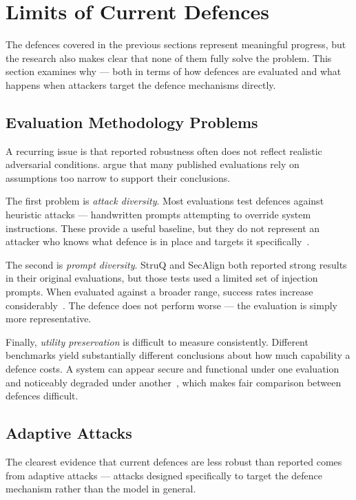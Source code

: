 \section{Limits of Current Defences}
\label{sec:limits}

The defences covered in the previous sections represent meaningful progress,
but the research also makes clear that none of them fully solve the problem.
This section examines why --- both in terms of how defences are evaluated and
what happens when attackers target the defence mechanisms directly.

\subsection{Evaluation Methodology Problems}

A recurring issue is that reported robustness often does not reflect realistic
adversarial conditions. \textcite{jia2025critical} argue that many published
evaluations rely on assumptions too narrow to support their conclusions.

The first problem is \textit{attack diversity}. Most evaluations test defences
against heuristic attacks --- handwritten prompts attempting to override system
instructions. These provide a useful baseline, but they do not represent an
attacker who knows what defence is in place and targets it
specifically~\parencite{jia2025critical}.

The second is \textit{prompt diversity}. StruQ and SecAlign both reported
strong results in their original evaluations, but those tests used a limited
set of injection prompts. When evaluated against a broader range, success rates
increase considerably~\parencite{jia2025critical}. The defence does not
perform worse --- the evaluation is simply more representative.

Finally, \textit{utility preservation} is difficult to measure consistently.
Different benchmarks yield substantially different conclusions about how much
capability a defence costs. A system can appear secure and functional under one
evaluation and noticeably degraded under another~\parencite{jia2025critical},
which makes fair comparison between defences difficult.

\subsection{Adaptive Attacks}

The clearest evidence that current defences are less robust than reported comes
from adaptive attacks --- attacks designed specifically to target the defence
mechanism rather than the model in general.


